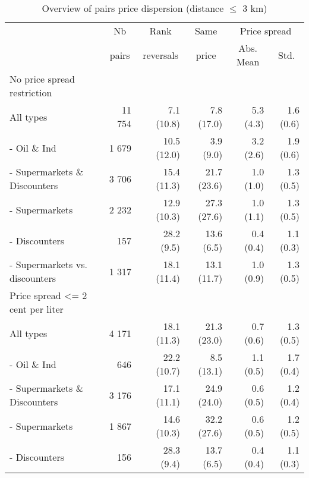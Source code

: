 \documentclass[english]{article}
\begin{document}
\begin{table}
\caption{Overview of pairs price dispersion (distance $\le$ 3 km)}
\label{tab:stats_pairs_3km}
\begin{threeparttable}
\begin{tabular}{lrrrrr}
    \toprule
    \toprule
          & \multicolumn{1}{c}{Nb} & \multicolumn{1}{c}{Rank} & \multicolumn{1}{c}{Same} & \multicolumn{2}{c}{Price spread} \\
          & \multicolumn{1}{c}{pairs} & \multicolumn{1}{c}{reversals} & \multicolumn{1}{c}{price} & \multicolumn{1}{c}{Abs. Mean} & \multicolumn{1}{c}{Std.} \\
    \midrule
    No price spread restriction &       &       &       &       &  \\
    All types & 11 754 & 7.1 (10.8) & 7.8 (17.0) & 5.3 (4.3) & 1.6 (0.6) \\
    - Oil \& Ind & 1 679 & 10.5 (12.0) & 3.9 \phantom{0}(9.0) & 3.2 (2.6) & 1.9 (0.6) \\
    - Supermarkets \& Discounters & 3 706 & 15.4 (11.3) & 21.7 (23.6) & 1.0 (1.0) & 1.3 (0.5) \\
    \hspace*{4mm} - Supermarkets & 2 232 & 12.9 (10.3) & 27.3 (27.6) & 1.0 (1.1) & 1.3 (0.5) \\
    \hspace*{4mm} - Discounters & 157   & 28.2 \phantom{0}(9.5) & 13.6 \phantom{0}(6.5) & 0.4 (0.4) & 1.1 (0.3) \\
    \hspace*{4mm} - Supermarkets vs. discounters & 1 317 & 18.1 (11.4) & 13.1 (11.7) & 1.0 (0.9) & 1.3 (0.5) \\
    \midrule
    Price spread <= 2 cent per liter &       &       &       &       &  \\
    All types & 4 171 & 18.1 (11.3) & 21.3 (23.0) & 0.7 (0.6) & 1.3 (0.5) \\
    - Oil \& Ind & 646   & 22.2 (10.7) & 8.5 (13.1) & 1.1 (0.5) & 1.7 (0.4) \\
    - Supermarkets \& Discounters & 3 176 & 17.1 (11.1) & 24.9 (24.0) & 0.6 (0.5) & 1.2 (0.4) \\
    \hspace*{4mm} - Supermarkets & 1 867 & 14.6 (10.3) & 32.2 (27.6) & 0.6 (0.5) & 1.2 (0.5) \\
    \hspace*{4mm} - Discounters & 156   & 28.3 \phantom{0}(9.4) & 13.7 \phantom{0}(6.5) & 0.4 (0.4) & 1.1 (0.3) \\

\end{tabular}
\end{threeparttable}
\end{table}
\end{document}
